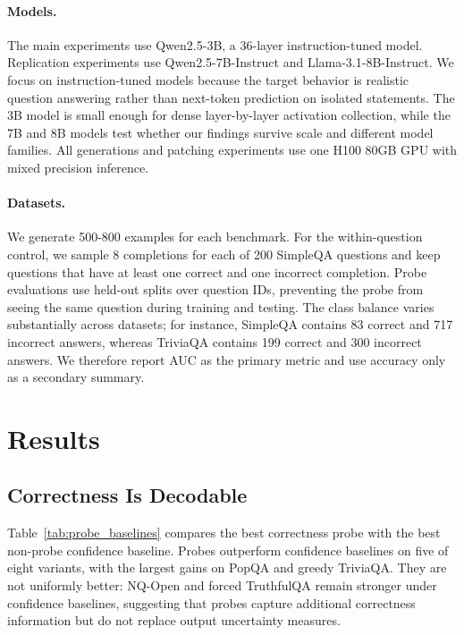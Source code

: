 \documentclass{article}
\begin{document}
\paragraph{Models.}
The main experiments use Qwen2.5-3B, a 36-layer instruction-tuned model. Replication experiments use Qwen2.5-7B-Instruct and Llama-3.1-8B-Instruct. We focus on instruction-tuned models because the target behavior is realistic question answering rather than next-token prediction on isolated statements. The 3B model is small enough for dense layer-by-layer activation collection, while the 7B and 8B models test whether our findings survive scale and different model families. All generations and patching experiments use one H100 80GB GPU with mixed precision inference.

\paragraph{Datasets.}
We generate 500-800 examples for each benchmark. For the within-question control, we sample 8 completions for each of 200 SimpleQA questions and keep questions that have at least one correct and one incorrect
completion. Probe evaluations use held-out splits over question IDs, preventing the probe from seeing the same question during training and testing. The class balance varies substantially across datasets; for instance, SimpleQA contains 83 correct and 717 incorrect answers, whereas TriviaQA contains 199 correct and 300 incorrect answers. We therefore report AUC as the primary metric and use accuracy only as a secondary summary.

\section{Results}

\subsection{Correctness Is Decodable}

Table~\ref{tab:probe_baselines} compares the best correctness probe with the best non-probe confidence baseline. Probes outperform confidence baselines on five of eight variants, with the largest gains on PopQA and greedy TriviaQA. They are not uniformly better: NQ-Open and forced TruthfulQA remain stronger under confidence baselines, suggesting that probes capture additional correctness information but do not replace output uncertainty measures.
\end{document}
